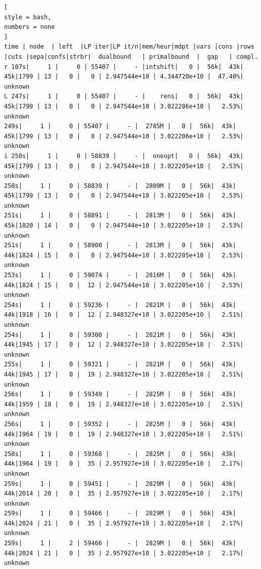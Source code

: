 \documentclass[%
	11pt,
	a4paper,
	utf8,
		]{article}
\begin{document}
\begin{lstlisting}[
style = bash,
numbers = none
]
time | node  | left  |LP iter|LP it/n|mem/heur|mdpt |vars |cons |rows |cuts |sepa|confs|strbr|  dualbound   | primalbound  |  gap   | compl. 
r 107s|     1 |     0 | 55407 |     - |intshift|   0 |  56k|  43k|  45k|1799 | 13 |   0 |   0 | 2.947544e+10 | 4.344720e+10 |  47.40%| unknown
L 247s|     1 |     0 | 55407 |     - |    rens|   0 |  56k|  43k|  45k|1799 | 13 |   0 |   0 | 2.947544e+10 | 3.022206e+10 |   2.53%| unknown
249s|     1 |     0 | 55407 |     - |  2785M |   0 |  56k|  43k|  45k|1799 | 13 |   0 |   0 | 2.947544e+10 | 3.022206e+10 |   2.53%| unknown
i 250s|     1 |     0 | 58839 |     - |  oneopt|   0 |  56k|  43k|  45k|1799 | 13 |   0 |   0 | 2.947544e+10 | 3.022205e+10 |   2.53%| unknown
250s|     1 |     0 | 58839 |     - |  2809M |   0 |  56k|  43k|  45k|1799 | 13 |   0 |   0 | 2.947544e+10 | 3.022205e+10 |   2.53%| unknown
251s|     1 |     0 | 58891 |     - |  2813M |   0 |  56k|  43k|  45k|1820 | 14 |   0 |   0 | 2.947544e+10 | 3.022205e+10 |   2.53%| unknown
251s|     1 |     0 | 58900 |     - |  2813M |   0 |  56k|  43k|  44k|1824 | 15 |   0 |   0 | 2.947544e+10 | 3.022205e+10 |   2.53%| unknown
253s|     1 |     0 | 59074 |     - |  2816M |   0 |  56k|  43k|  44k|1824 | 15 |   0 |  12 | 2.947544e+10 | 3.022205e+10 |   2.53%| unknown
254s|     1 |     0 | 59236 |     - |  2821M |   0 |  56k|  43k|  44k|1918 | 16 |   0 |  12 | 2.948327e+10 | 3.022205e+10 |   2.51%| unknown
254s|     1 |     0 | 59300 |     - |  2821M |   0 |  56k|  43k|  44k|1945 | 17 |   0 |  12 | 2.948327e+10 | 3.022205e+10 |   2.51%| unknown
255s|     1 |     0 | 59321 |     - |  2821M |   0 |  56k|  43k|  44k|1945 | 17 |   0 |  19 | 2.948327e+10 | 3.022205e+10 |   2.51%| unknown
256s|     1 |     0 | 59349 |     - |  2825M |   0 |  56k|  43k|  44k|1959 | 18 |   0 |  19 | 2.948327e+10 | 3.022205e+10 |   2.51%| unknown
256s|     1 |     0 | 59352 |     - |  2825M |   0 |  56k|  43k|  44k|1964 | 19 |   0 |  19 | 2.948327e+10 | 3.022205e+10 |   2.51%| unknown
258s|     1 |     0 | 59368 |     - |  2825M |   0 |  56k|  43k|  44k|1964 | 19 |   0 |  35 | 2.957927e+10 | 3.022205e+10 |   2.17%| unknown
259s|     1 |     0 | 59451 |     - |  2829M |   0 |  56k|  43k|  44k|2014 | 20 |   0 |  35 | 2.957927e+10 | 3.022205e+10 |   2.17%| unknown
259s|     1 |     0 | 59466 |     - |  2829M |   0 |  56k|  43k|  44k|2024 | 21 |   0 |  35 | 2.957927e+10 | 3.022205e+10 |   2.17%| unknown
259s|     1 |     2 | 59466 |     - |  2829M |   0 |  56k|  43k|  44k|2024 | 21 |   0 |  35 | 2.957927e+10 | 3.022205e+10 |   2.17%| unknown
\end{lstlisting}
\end{document}
